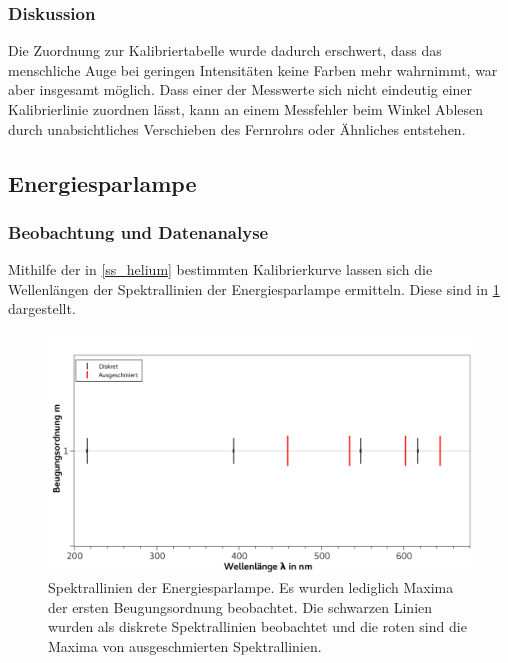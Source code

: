 \documentclass[
	a4paper,
	12pt,
	pagesize,
	ngerman
]{scrartcl}
\begin{document}
	\subsubsection{Diskussion}
	Die Zuordnung zur Kalibriertabelle wurde dadurch erschwert, dass das menschliche Auge bei geringen Intensitäten keine Farben mehr wahrnimmt, war aber insgesamt möglich.
	Dass einer der Messwerte sich nicht eindeutig einer Kalibrierlinie zuordnen lässt, kann an einem Messfehler beim Winkel Ablesen durch unabsichtliches Verschieben des Fernrohrs oder Ähnliches entstehen.
	
	\subsection{Energiesparlampe}
	\subsubsection{Beobachtung und Datenanalyse}
	Mithilfe der in \cref{ss_helium} bestimmten Kalibrierkurve lassen sich die Wellenlängen der Spektrallinien der Energiesparlampe ermitteln.
	Diese sind in \cref{fig_spar} dargestellt.


	\begin{figure}[H] 
		\includegraphics[width=1\textwidth]{fig_spar} 
		\centering
		\caption{Spektrallinien der Energiesparlampe.
		Es wurden lediglich Maxima der ersten Beugungsordnung beobachtet. 
		Die schwarzen Linien wurden als diskrete Spektrallinien beobachtet und die roten sind die Maxima von ausgeschmierten Spektrallinien. 
		}
		\label{fig_spar}
		\centering
	\end{figure}
	
\end{document}

